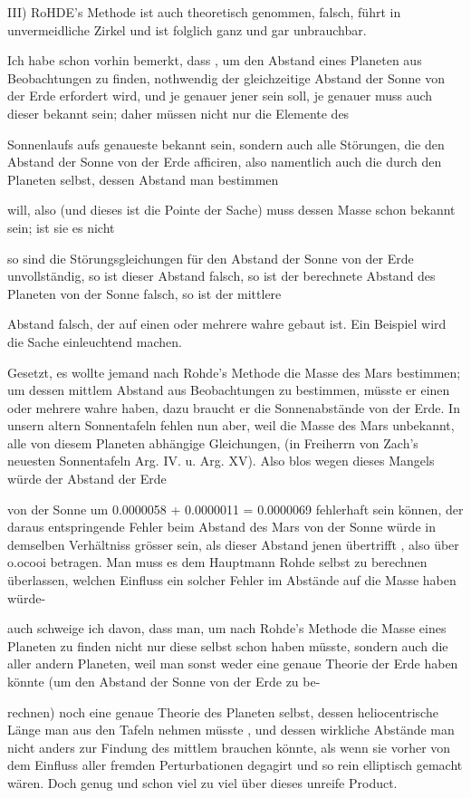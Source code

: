 \documentclass[10pt,a4paper]{article}
\begin{document}
III) RoHDE's Methode ist auch theoretisch genommen, falsch, führt in unvermeidliche Zirkel und ist folglich ganz und gar unbrauchbar.

Ich habe schon vorhin bemerkt, dass , um den Abstand eines Planeten aus Beobachtungen zu finden, nothwendig der gleichzeitige Abstand der Sonne von der Erde erfordert wird, und je genauer jener sein soll, je genauer muss auch dieser bekannt sein; daher müssen nicht nur die Elemente des

Sonnenlaufs aufs genaueste bekannt sein, sondern auch alle Störungen, die den Abstand der Sonne von der Erde afficiren, also namentlich auch die durch den Planeten selbst, dessen Abstand man bestimmen

will, also (und dieses ist die Pointe der Sache) muss dessen Masse schon bekannt sein; ist sie es nicht

so sind die Störungsgleichungen für den Abstand der Sonne von der Erde unvollständig, so ist dieser Abstand falsch, so ist der berechnete Abstand des Planeten von der Sonne falsch, so ist der mittlere

Abstand falsch, der auf einen oder mehrere wahre gebaut ist. Ein Beispiel wird die Sache einleuchtend machen.

Gesetzt, es wollte jemand nach Rohde's Methode die Masse des Mars bestimmen; um dessen mittlem Abstand aus Beobachtungen zu bestimmen, müsste er einen oder mehrere wahre haben, dazu braucht er die Sonnenabstände von der Erde. In unsern altern Sonnentafeln fehlen nun aber, weil die Masse des Mars unbekannt, alle von diesem Planeten abhängige Gleichungen, (in Freiherrn von Zach's neuesten Sonnentafeln Arg. IV. u. Arg. XV). Also blos wegen dieses Mangels würde der Abstand der Erde

von der Sonne um 0.0000058 + 0.0000011 = 0.0000069 fehlerhaft sein können, der daraus entspringende Fehler beim Abstand des Mars von der Sonne würde in demselben Verhältniss grösser sein, als dieser Abstand jenen übertrifft , also über o.ocooi betragen. Man muss es dem Hauptmann Rohde selbst zu berechnen überlassen, welchen Einfluss ein solcher Fehler im Abstände auf die Masse haben würde-

auch schweige ich davon, dass man, um nach Rohde's Methode die Masse eines Planeten zu finden nicht nur diese selbst schon haben müsste, sondern auch die aller andern Planeten, weil man sonst weder eine genaue Theorie der Erde haben könnte (um den Abstand der Sonne von der Erde zu be-

rechnen) noch eine genaue Theorie des Planeten selbst, dessen heliocentrische Länge man aus den Tafeln nehmen müsste , und dessen wirkliche Abstände man nicht anders zur Findung des mittlem brauchen könnte, als wenn sie vorher von dem Einfluss aller fremden Perturbationen degagirt und so rein elliptisch gemacht wären. Doch genug und schon viel zu viel über dieses unreife Product.
\end{document}
